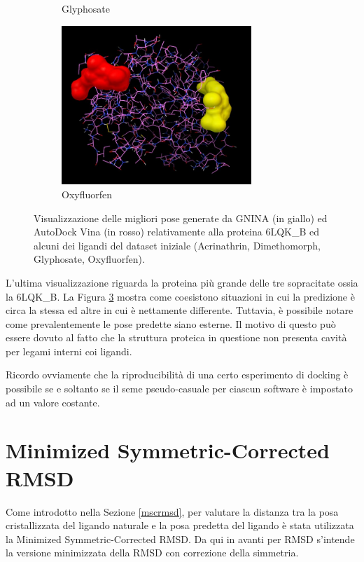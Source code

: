 \begin{figure}[H]
\begin{subfigure}[b]{0.475\textwidth}
        \caption[]%
        {{\small Glyphosate}}    
        \label{fig:2h8v_glyphosate}
    \end{subfigure}
    \hfill
    \begin{subfigure}[b]{0.475\textwidth}   
        \centering 
        \includegraphics[width=\textwidth, height=6cm]{images/6lqk_b_oxyfluorfen.jpg}
        \caption[]%
        {{\small Oxyfluorfen}}    
        \label{fig:2h8v_oxyfluorfen}
        \end{subfigure}
    \caption[Conformazioni proteina-ligando per la proteina 6LQK\_B. ]
    {\small Visualizzazione delle migliori pose generate da GNINA (in giallo) ed AutoDock Vina (in rosso) relativamente alla proteina 6LQK\_B ed alcuni dei ligandi del dataset iniziale (Acrinathrin, Dimethomorph, Glyphosate, Oxyfluorfen).} 
    \label{fig:6lqk_b}
\end{figure}

L'ultima visualizzazione riguarda la proteina più grande delle tre sopracitate ossia la 6LQK\_B. La Figura \ref{fig:6lqk_b} mostra come coesistono situazioni in cui la predizione è circa la stessa ed altre in cui è nettamente differente.
Tuttavia, è possibile notare come prevalentemente le pose predette siano esterne. Il motivo di questo può essere dovuto al fatto che la struttura proteica in questione non presenta cavità per legami interni coi ligandi.


Ricordo ovviamente che la riproducibilità di una certo esperimento di docking è possibile se e soltanto se il seme pseudo-casuale per ciascun software è impostato ad un valore costante. 
\section{Minimized Symmetric-Corrected RMSD}
Come introdotto nella Sezione \ref{mscrmsd}, per valutare la distanza tra la posa cristallizzata del ligando naturale e la posa predetta del ligando è stata utilizzata la Minimized Symmetric-Corrected RMSD.
Da qui in avanti per RMSD s'intende la versione minimizzata della RMSD con correzione della simmetria.

